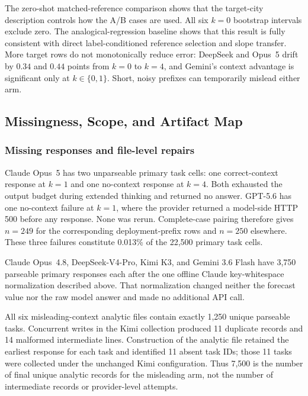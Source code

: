 The zero-shot matched-reference comparison shows that the target-city description
controls how the A/B cases are used. All six $k=0$ bootstrap intervals exclude
zero. The analogical-regression baseline shows that this result is fully
consistent with direct label-conditioned reference selection and slope transfer.
More target rows do not monotonically reduce error: DeepSeek and Opus~5 drift by
$0.34$ and $0.44$ points from $k=0$ to $k=4$, and Gemini's context advantage is
significant only at $k\in\{0,1\}$. Short, noisy prefixes can temporarily mislead
either arm.

\subsection{Missingness, Scope, and Artifact Map}
\label{app:coin-city-limitations}

\subsubsection{Missing responses and file-level repairs}
Claude Opus~5 has two unparseable primary task cells: one correct-context response
at \(k=1\) and one no-context response at \(k=4\). Both exhausted the output
budget during extended thinking and returned no answer. GPT-5.6 has one
no-context failure at \(k=1\), where the provider returned a model-side HTTP 500
before any response. None was rerun. Complete-case pairing therefore gives
\(n=249\) for the corresponding deployment-prefix rows and \(n=250\) elsewhere.
These three failures constitute 0.013\% of the 22,500 primary task cells.

Claude Opus~4.8, DeepSeek-V4-Pro, Kimi K3, and Gemini 3.6 Flash have 3,750
parseable primary responses each after the one offline Claude key-whitespace
normalization described above. That normalization changed neither the forecast
value nor the raw model answer and made no additional API call.

All six misleading-context analytic files contain exactly 1,250 unique parseable
tasks. Concurrent writes in the Kimi collection produced 11 duplicate records and
14 malformed intermediate lines. Construction of the analytic file retained the
earliest response for each task and identified 11 absent task IDs; those 11 tasks
were collected under the unchanged Kimi configuration. Thus 7,500 is the number
of final unique analytic records for the misleading arm, not the number of
intermediate records or provider-level attempts.

